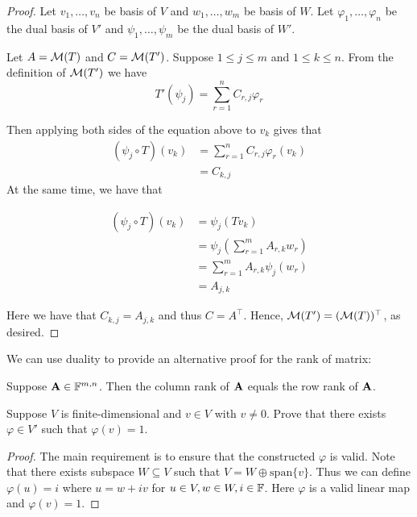 \documentclass{extarticle}
\begin{document}
\begin{proof}
Let \(v_1, \ldots, v_n\) be basis of \(V\) and \(w_1, \ldots, w_m\) be basis of \(W\). Let 
\(\varphi_1, \ldots, \varphi_n\) be the dual basis of \(V'\) and \(\psi_1, \ldots, \psi_m\) 
be the dual basis of \(W'\). 

Let \(A = \mathcal{M}(T)\) and \(C = \mathcal{M}(T')\). Suppose \(1 \leq j \leq m\) and \(1 \leq k \leq n\). From 
the definition of \(\mathcal{M}(T')\) we have 
\[T'(\psi_j) = \sum_{r=1}^{n} C_{r, j} \varphi_r\]

Then applying both sides of the equation above to \(v_k\) gives that 
\begin{align*}
    (\psi_j \circ T) (v_k) 
    & = \sum_{r=1}^{n} C_{r, j} \varphi_r (v_k) \\ 
    & = C_{k, j}
\end{align*}
At the same time, we have that 

\begin{align*}
    (\psi_j \circ T) (v_k)
    &= \psi_j (T v_k) \\ 
    &= \psi_j(\sum_{r=1}^{m}A_{r, k} w_r) \\ 
    &= \sum_{r=1}^{m} A_{r, k} \psi_j (w_r) \\ 
    &= A_{j, k}
\end{align*}

Here we have that \(C_{k, j} = A_{j, k}\) and thus \(C = A^\top\). Hence, \(\mathcal{M}(T') = (\mathcal{M}(T))^\top\), 
as desired. 

\end{proof}


We can use duality to provide an alternative proof for the rank of matrix:

\begin{thm}
    Suppose \(\mathbf{A} \in \mathbb{F}^{m, n}\). Then the column rank of \(\mathbf{A}\) equals the row 
    rank of \(\mathbf{A}\). 
\end{thm}


\newpage 
{}
\begin{problem}{3}
    Suppose \(V\) is finite-dimensional and \(v \in V\) with \(v \neq 0\). Prove that 
    there exists \(\varphi \in V'\) such that \(\varphi(v) = 1\). 
\end{problem}

\begin{proof}
The main requirement is to ensure that the constructed \(\varphi\) is valid. Note that 
there exists  subspace \(W \subseteq V\) such that \(V = W \oplus \text{span}\{v\}\). Thus 
we can define \(\varphi(u) = i\) where \(u = w + iv\) for \(u \in V, w \in W, i \in \mathbb{F}\). Here 
\(\varphi\) is a valid linear map and \(\varphi(v) = 1\). 
\end{proof}
\end{document}
